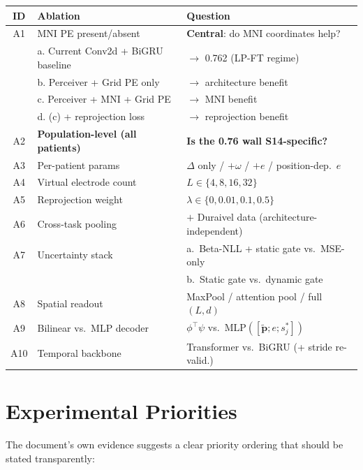 \documentclass[11pt,letterpaper]{article}
\newcommand{\bfp}{\mathbf{p}}
\begin{document}
\begin{table}[ht!]\centering\small
\begin{tabular}{@{}clp{6.6cm}@{}}
\toprule
\textbf{ID} & \textbf{Ablation} & \textbf{Question} \\
\midrule
A1 & MNI PE present/absent & \textbf{Central}: do MNI coordinates help? \\
 & \quad a. Current Conv2d + BiGRU baseline & $\to$ 0.762 (LP-FT regime) \\
 & \quad b. Perceiver + Grid PE only & $\to$ architecture benefit \\
 & \quad c. Perceiver + MNI + Grid PE & $\to$ MNI benefit \\
 & \quad d. (c) + reprojection loss & $\to$ reprojection benefit \\
\midrule
A2 & \textbf{Population-level (all patients)} & \textbf{Is the 0.76 wall S14-specific?} \\
\midrule
A3 & Per-patient params & $\Delta$ only / $+\omega$ / $+e$ / position-dep.\ $e$ \\
A4 & Virtual electrode count & $L \in \{4, 8, 16, 32\}$ \\
A5 & Reprojection weight & $\lambda \in \{0, 0.01, 0.1, 0.5\}$ \\
A6 & Cross-task pooling & $+$ Duraivel data (architecture-independent) \\
A7 & Uncertainty stack & a.\ Beta-NLL + static gate vs.\ MSE-only\\
 & & b.\ Static gate vs.\ dynamic gate \\
A8 & Spatial readout & MaxPool / attention pool / full $(L,d)$ \\
A9 & Bilinear vs.\ MLP decoder & $\phi^\top\psi$ vs.\ $\text{MLP}([\tilde{\bfp}; e; s_j^*])$ \\
A10 & Temporal backbone & Transformer vs.\ BiGRU (+ stride re-valid.) \\
\bottomrule
\end{tabular}
\end{table}


\section{Experimental Priorities}\label{sec:priorities}

The document's own evidence suggests a clear priority ordering that should be stated transparently:
\end{document}
